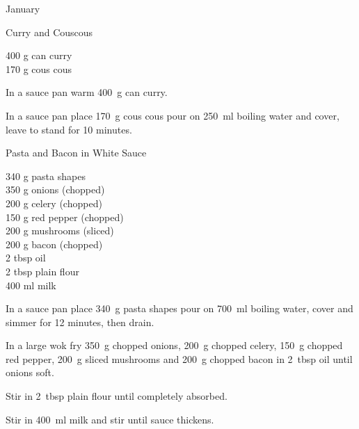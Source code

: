 \begin{menu}{January}
    \begin{recipe}{1}{Curry and Couscous}%
		\begin{ingredients}
		400 g can curry  \\
	170 g cous cous  \\
	
		\end{ingredients}
	
	
	
    \begin{instructions}
    \item 
        In a sauce pan warm
        400~g  can curry.
      \item 
    In a
    sauce pan
    place
    170~g  cous cous
    pour on
    250~ml  boiling water
    and cover, leave to stand for 10 minutes.
  
    \end{instructions}
    \end{recipe}%
  
    \begin{recipe}{2}{Pasta and Bacon in White Sauce}%
		\begin{ingredients}
		340 g pasta shapes  \\
	350 g onions (chopped) \\
	200 g celery (chopped) \\
	150 g red pepper (chopped) \\
	200 g mushrooms (sliced) \\
	200 g bacon (chopped) \\
	2 tbsp oil  \\
	2 tbsp plain flour  \\
	400 ml milk  \\
	
		\end{ingredients}
	
	
    \begin{instructions}
    \item 
    In a
    sauce pan
    place
    340~g  pasta shapes
    pour on
    700~ml  boiling water,
    cover and simmer for 12 minutes, then drain.
  \item 
        In a large wok fry
        350~g chopped onions,
        200~g chopped celery,
        150~g chopped red pepper,
        200~g sliced mushrooms
        and
        200~g chopped bacon
        in
        2~tbsp  oil
        until onions soft.
      \item 
        Stir in
        2~tbsp  plain flour
        until completely absorbed.
      \item 
        Stir in
        400~ml  milk
        and stir
        until sauce thickens.
      

\end{instructions}
\end{recipe}
\end{menu}
